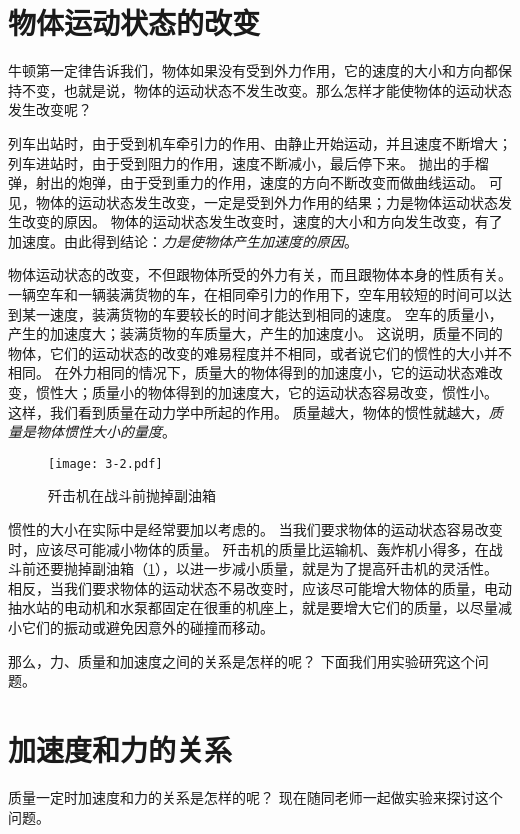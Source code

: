 \section{物体运动状态的改变}
牛顿第一定律告诉我们，物体如果没有受到外力作用，它的速度的大小和方向都保持不变，也就是说，物体的运动状态不发生改变。那么怎样才能使物体的运动状态发生改变呢？

列车出站时，由于受到机车牵引力的作用、由静止开始运动，并且速度不断增大；列车进站时，由于受到阻力的作用，速度不断减小，最后停下来。
抛出的手榴弹，射出的炮弹，由于受到重力的作用，速度的方向不断改变而做曲线运动。
可见，物体的运动状态发生改变，一定是受到外力作用的结果；力是物体运动状态发生改变的原因。
物体的运动状态发生改变时，速度的大小和方向发生改变，有了加速度。由此得到结论：\emph{力是使物体产生加速度的原因}。

物体运动状态的改变，不但跟物体所受的外力有关，而且跟物体本身的性质有关。
一辆空车和一辆装满货物的车，在相同牵引力的作用下，空车用较短的时间可以达到某一速度，装满货物的车要较长的时间才能达到相同的速度。
空车的质量小，产生的加速度大；装满货物的车质量大，产生的加速度小。
这说明，质量不同的物体，它们的运动状态的改变的难易程度并不相同，或者说它们的惯性的大小并不相同。
在外力相同的情况下，质量大的物体得到的加速度小，它的运动状态难改变，惯性大；质量小的物体得到的加速度大，它的运动状态容易改变，惯性小。
这样，我们看到质量在动力学中所起的作用。
质量越大，物体的惯性就越大，\emph{质量是物体惯性大小的量度}。

\begin{figure}
  \texttt{[image: 3-2.pdf]}
  \caption{歼击机在战斗前抛掉副油箱}\label{fig:3-2}
\end{figure}

惯性的大小在实际中是经常要加以考虑的。
当我们要求物体的运动状态容易改变时，应该尽可能减小物体的质量。
歼击机的质量比运输机、轰炸机小得多，在战斗前还要抛掉副油箱（\cref{fig:3-2}），以进一步减小质量，就是为了提高歼击机的灵活性。
相反，当我们要求物体的运动状态不易改变时，应该尽可能增大物体的质量，电动抽水站的电动机和水泵都固定在很重的机座上，就是要增大它们的质量，以尽量减小它们的振动或避免因意外的碰撞而移动。

那么，力、质量和加速度之间的关系是怎样的呢？
下面我们用实验研究这个问题。

\section{加速度和力的关系}\label{sec:force_acceleration}
质量一定时加速度和力的关系是怎样的呢？
现在随同老师一起做实验来探讨这个问题。

